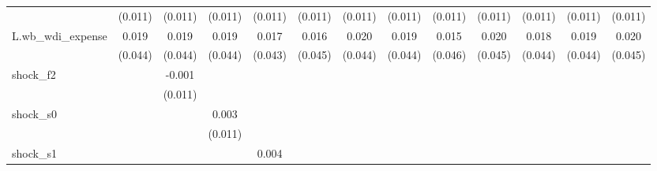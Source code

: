 {\begin{tabular}{l*{12}{c}}
            &     (0.011)         &     (0.011)         &     (0.011)         &     (0.011)         &     (0.011)         &     (0.011)         &     (0.011)         &     (0.011)         &     (0.011)         &     (0.011)         &     (0.011)         &     (0.011)         \\
\addlinespace
L.wb\_wdi\_expense&       0.019         &       0.019         &       0.019         &       0.017         &       0.016         &       0.020         &       0.019         &       0.015         &       0.020         &       0.018         &       0.019         &       0.020         \\
            &     (0.044)         &     (0.044)         &     (0.044)         &     (0.043)         &     (0.045)         &     (0.044)         &     (0.044)         &     (0.046)         &     (0.045)         &     (0.044)         &     (0.044)         &     (0.045)         \\
\addlinespace
shock\_f2    &                     &      -0.001         &                     &                     &                     &                     &                     &                     &                     &                     &                     &                     \\
            &                     &     (0.011)         &                     &                     &                     &                     &                     &                     &                     &                     &                     &                     \\
\addlinespace
shock\_s0    &                     &                     &       0.003         &                     &                     &                     &                     &                     &                     &                     &                     &                     \\
            &                     &                     &     (0.011)         &                     &                     &                     &                     &                     &                     &                     &                     &                     \\
\addlinespace
shock\_s1    &                     &                     &                     &       0.004         &                     &                     &                     &                     &                     &                     &                     &                     \\

\end{tabular}}

